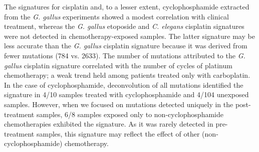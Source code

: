 \documentclass{bmcart}
\begin{document}


The signatures for cisplatin and, to a lesser extent, cyclophosphamide extracted from the \textit{G. gallus} experiments showed a modest correlation with clinical treatment, whereas the \textit{G. gallus} etoposide and \textit{C. elegans} cisplatin signatures were not detected in chemotherapy-exposed samples. The latter signature may be less accurate than the \textit{G. gallus} cisplatin signature because it was derived from fewer mutations (784 vs. 2633).  The number of mutations attributed to the \textit{G. gallus} cisplatin signature correlated with the number of cycles of platinum chemotherapy; a weak trend held among patients treated only with carboplatin. In the case of cyclophosphamide, deconvolution of all mutations identified the signature in 4/10 samples treated with cyclophosphamide and 4/104 unexposed samples. However, when we focused on mutations detected uniquely in the post-treatment samples, 6/8 samples exposed only to non-cyclophosphamide chemotherapies exhibited the signature. As it was rarely detected in pre-treatment samples, this signature may reflect the effect of other (non-cyclophosphamide) chemotherapy.



\end{document}
